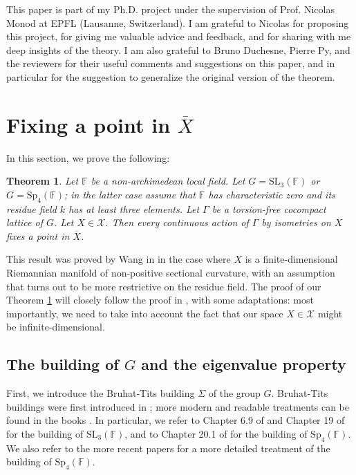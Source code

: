 \documentclass{article}
\theoremstyle{definition}
\theoremstyle{remark}
\theoremstyle{plain}
\newtheorem{thm}[dfn]{Theorem}
\begin{document}
This paper is part of my Ph.D. project under the supervision of Prof. Nicolas Monod at EPFL (Lausanne, Switzerland). I am grateful to Nicolas for proposing this project, for giving me valuable advice and feedback, and for sharing with me deep insights of the theory. I am also grateful to Bruno Duchesne, Pierre Py, and the reviewers for their useful comments and suggestions on this paper, and in particular for the suggestion to generalize the original version of the theorem. \\

\section{Fixing a point in $\overline{X}$}

In this section, we prove the following:

\begin{thm} \label{main2}
    Let $\mathbb{F}$ be a non-archimedean local field. Let $G=\mathrm{SL}_3(\mathbb{F})$ or $G=\mathrm{Sp}_4(\mathbb{F})$; in the latter case assume that $\mathbb{F}$ has characteristic zero and its residue field $k$ has at least three elements. Let $\Gamma$ be a torsion-free cocompact lattice of $G$. Let $X\in\mathcal{X}$. Then every continuous action of $\Gamma$ by isometries on $X$ fixes a point in $\overline{X}$. \\
\end{thm}

This result was proved by Wang in \cite{wang} in the case where $X$ is a finite-dimensional Riemannian manifold of non-positive sectional curvature, with an assumption that turns out to be more restrictive on the residue field. The proof of our Theorem \ref{main2} will closely follow the proof in \cite{wang}, with some adaptations: most importantly, we need to take into account the fact that our space $X\in\mathcal{X}$ might be infinite-dimensional. \\

\subsection{The building of $G$ and the eigenvalue property}

First, we introduce the Bruhat-Tits building $\Sigma$ of the group $G$. Bruhat-Tits buildings were first introduced in \cite{bruhattits}; more modern and readable treatments can be found in the books \cite{buildings,garrett}. In particular, we refer to Chapter 6.9 of \cite{buildings} and Chapter 19 of \cite{garrett} for the building of $\mathrm{SL}_3(\mathbb{F})$, and to Chapter 20.1 of \cite{garrett} for the building of $\mathrm{Sp}_4(\mathbb{F})$. We also refer to the more recent papers \cite{buildspn,expspn,zetasp4} for a more detailed treatment of the building of $\mathrm{Sp}_4(\mathbb{F})$. \\
\end{document}
